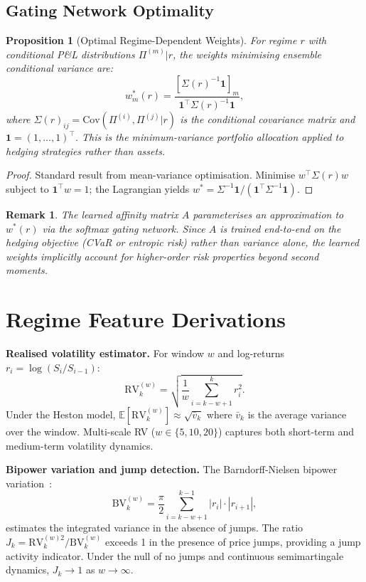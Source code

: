 \documentclass[11pt]{article}
\newtheorem{proposition}[theorem]{Proposition}
\newtheorem{remark}[theorem]{Remark}
\newcommand{\E}{\mathbb{E}}
\begin{document}
\subsection{Gating Network Optimality}

\begin{proposition}[Optimal Regime-Dependent Weights]
\label{prop:optimal_weights}
For regime $r$ with conditional P\&L distributions $\Pi^{(m)}|r$, the weights minimising ensemble conditional variance are:
\begin{equation}
    w_m^*(r) = \frac{[\Sigma(r)^{-1}\mathbf{1}]_m}{\mathbf{1}^\top\Sigma(r)^{-1}\mathbf{1}},
\end{equation}
where $\Sigma(r)_{ij} = \mathrm{Cov}(\Pi^{(i)},\Pi^{(j)} | r)$ is the conditional covariance matrix and $\mathbf{1} = (1,\ldots,1)^\top$.  This is the minimum-variance portfolio allocation applied to hedging strategies rather than assets.
\end{proposition}

\begin{proof}
Standard result from mean-variance optimisation.  Minimise $w^\top\Sigma(r)w$ subject to $\mathbf{1}^\top w = 1$; the Lagrangian yields $w^* = \Sigma^{-1}\mathbf{1}/(\mathbf{1}^\top\Sigma^{-1}\mathbf{1})$.
\end{proof}

\begin{remark}
The learned affinity matrix $A$ parameterises an approximation to $w^*(r)$ via the softmax gating network.  Since $A$ is trained end-to-end on the hedging objective (CVaR or entropic risk) rather than variance alone, the learned weights implicitly account for higher-order risk properties beyond second moments.
\end{remark}

\section{Regime Feature Derivations}
\label{app:features}

\textbf{Realised volatility estimator.}  For window $w$ and log-returns $r_i = \log(S_i/S_{i-1})$:
\begin{equation}
    \mathrm{RV}_k^{(w)} = \sqrt{\frac{1}{w}\sum_{i=k-w+1}^{k} r_i^2}.
\end{equation}
Under the Heston model, $\E[\mathrm{RV}_k^{(w)}] \approx \sqrt{\bar v_k}$ where $\bar v_k$ is the average variance over the window.  Multi-scale RV ($w \in \{5,10,20\}$) captures both short-term and medium-term volatility dynamics.

\textbf{Bipower variation and jump detection.}  The Barndorff-Nielsen bipower variation~\citep{barndorffnielsen2002econometric}:
\begin{equation}
    \mathrm{BV}_k^{(w)} = \frac{\pi}{2}\sum_{i=k-w+1}^{k-1} |r_i|\cdot|r_{i+1}|,
\end{equation}
estimates the integrated variance in the absence of jumps.  The ratio $J_k = \mathrm{RV}_k^{(w)2}/\mathrm{BV}_k^{(w)}$ exceeds 1 in the presence of price jumps, providing a jump activity indicator.  Under the null of no jumps and continuous semimartingale dynamics, $J_k \to 1$ as $w \to \infty$.
\end{document}
